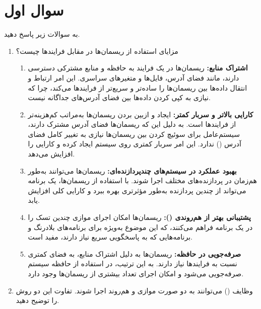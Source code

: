 \section{سوال اول}

به سوالات زیر پاسخ دهید.

\begin{enumerate}
	\item 
	مزایای استفاده از ریسمان‌ها در مقابل فرایندها چیست؟
	\begin{qsolve}
		\begin{enumerate}
			\item 
			\textbf{اشتراک منابع:} ریسمان‌ها در یک فرایند به حافظه و منابع مشترکی دسترسی دارند، مانند فضای آدرس، فایل‌ها و متغیرهای سراسری. این امر ارتباط و انتقال داده‌ها بین ریسمان‌ها را ساده‌تر و سریع‌تر از فرایندها می‌کند، چرا که نیازی به کپی کردن داده‌ها بین فضای آدرس‌های جداگانه نیست.
		
		
			\item 
			\textbf{کارایی بالاتر و سربار کمتر:} ایجاد و ازبین بردن ریسمان‌ها به‌مراتب کم‌هزینه‌تر از فرایندها است. به دلیل این که ریسمان‌ها فضای آدرس مشترک دارند، سیستم‌عامل برای سوئیچ کردن بین ریسمان‌ها نیازی به تغییر کامل فضای آدرس () ندارد. این امر سربار کمتری روی سیستم ایجاد کرده و کارایی را افزایش می‌دهد.
			
			
			\item 
			\textbf{بهبود عملکرد در سیستم‌های چندپردازنده‌ای:} ریسمان‌ها می‌توانند به‌طور هم‌زمان در پردازنده‌های مختلف اجرا شوند. با استفاده از ریسمان‌ها، یک برنامه می‌تواند از چندین پردازنده به‌طور مؤثرتری بهره ببرد و کارایی کلی افزایش یابد.
			
			
			\item 
			\textbf{پشتیبانی بهتر از هم‌روندی ():} ریسمان‌ها امکان اجرای موازی چندین تسک را در یک برنامه فراهم می‌کنند، که این موضوع به‌ویژه برای برنامه‌های بلادرنگ و برنامه‌هایی که به پاسخگویی سریع نیاز دارند، مفید است.
		
		
			
			\item 
			\textbf{صرفه‌جویی در حافظه:} ریسمان‌ها به دلیل اشتراک منابع، به فضای کمتری نسبت به فرایندها نیاز دارند. به این ترتیب، در استفاده از حافظه سیستم صرفه‌جویی می‌شود و امکان اجرای تعداد بیشتری از ریسمان‌ها وجود دارد.
		\end{enumerate}
	\end{qsolve}
	
	
	
	\item 
	وظایف () می‌توانند به دو صورت موازی و هم‌روند اجرا شوند. تفاوت این دو روش را توضیح دهید.


\end{enumerate}

